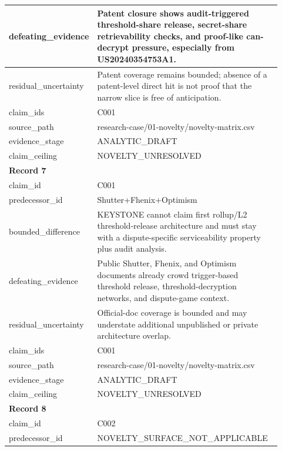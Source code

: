 \begin{longtable}{|p{0.24\linewidth}|p{0.68\linewidth}|}
defeating\_\allowbreak{}evidence & Patent closure shows audit-triggered threshold-share release, secret-share retrievability checks, and proof-like can-decrypt pressure, especially from US20240354753A1. \\ \hline
residual\_\allowbreak{}uncertainty & Patent coverage remains bounded;\allowbreak{} absence of a patent-level direct hit is not proof that the narrow slice is free of anticipation. \\ \hline
claim\_\allowbreak{}ids & C001 \\ \hline
source\_\allowbreak{}path & research-case/01-novelty/novelty-matrix.csv \\ \hline
evidence\_\allowbreak{}stage & ANALYTIC\_\allowbreak{}DRAFT \\ \hline
claim\_\allowbreak{}ceiling & NOVELTY\_\allowbreak{}UNRESOLVED \\ \hline
\multicolumn{2}{|l|}{\textbf{Record 7}} \\ \hline
claim\_\allowbreak{}id & C001 \\ \hline
predecessor\_\allowbreak{}id & Shutter+Fhenix+Optimism \\ \hline
bounded\_\allowbreak{}difference & KEYSTONE cannot claim first rollup/L2 threshold-release architecture and must stay with a dispute-specific serviceability property plus audit analysis. \\ \hline
defeating\_\allowbreak{}evidence & Public Shutter, Fhenix, and Optimism documents already crowd trigger-based threshold release, threshold-decryption networks, and dispute-game context. \\ \hline
residual\_\allowbreak{}uncertainty & Official-doc coverage is bounded and may understate additional unpublished or private architecture overlap. \\ \hline
claim\_\allowbreak{}ids & C001 \\ \hline
source\_\allowbreak{}path & research-case/01-novelty/novelty-matrix.csv \\ \hline
evidence\_\allowbreak{}stage & ANALYTIC\_\allowbreak{}DRAFT \\ \hline
claim\_\allowbreak{}ceiling & NOVELTY\_\allowbreak{}UNRESOLVED \\ \hline
\multicolumn{2}{|l|}{\textbf{Record 8}} \\ \hline
claim\_\allowbreak{}id & C002 \\ \hline
predecessor\_\allowbreak{}id & NOVELTY\_\allowbreak{}SURFACE\_\allowbreak{}NOT\_\allowbreak{}APPLICABLE \\ \hline

\end{longtable}
